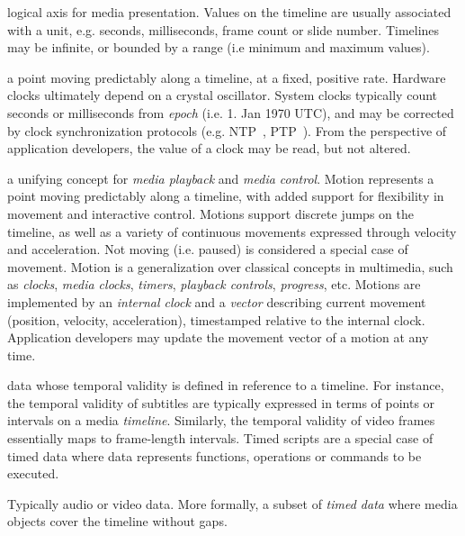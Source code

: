 
logical axis for media presentation. Values on the timeline are usually
associated with a unit, e.g. seconds, milliseconds, frame count or slide
number. Timelines may be infinite, or bounded by a range (i.e minimum and
maximum values).


a point moving predictably along a timeline, at a fixed, positive rate.
Hardware clocks ultimately depend on a crystal oscillator. System clocks
typically count seconds or milliseconds from \emph{epoch} (i.e. 1. Jan 1970
UTC), and may be corrected by clock synchronization protocols (e.g.
NTP~\cite{ntp}, PTP~\cite{ptp}). From the perspective of application
developers, the value of a clock may be read, but not altered.


a unifying concept for \emph{media playback} and \emph{media control}. Motion
represents a point moving predictably along a timeline, with added support for
flexibility in movement and interactive control. Motions support discrete
jumps on the timeline, as well as a variety of continuous movements expressed
through velocity and acceleration. Not moving (i.e. paused) is considered a
special case of movement. Motion is a generalization over classical concepts
in multimedia, such as \emph{clocks}, \emph{media clocks}, \emph{timers},
\emph{playback controls}, \emph{progress}, etc. Motions are implemented by an
\emph{internal clock} and a \emph{vector} describing current movement (position,
velocity, acceleration), timestamped relative to the internal clock.
Application developers may update the movement vector of a motion at any time.


data whose temporal validity is defined in reference to a timeline. For
instance, the temporal validity of subtitles are typically expressed in terms
of points or intervals on a media \emph{timeline}. Similarly, the temporal validity
of video frames essentially maps to frame-length intervals. Timed scripts are
a special case of timed data where data represents functions, operations or
commands to be executed.



Typically audio or video data. More formally, a subset of \emph{timed data}
where media objects cover the timeline without gaps.



